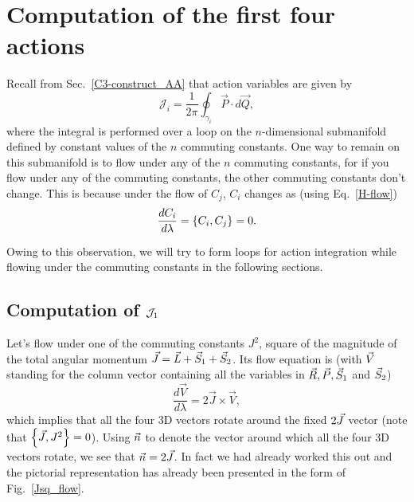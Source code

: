 \chapter{Computation of the first four actions}    \label{chapter-5}





Recall from Sec.~\ref{C3-construct_AA} that action variables are given by
\begin{equation}
\mathcal{J}_{i}=\frac{1}{2 \pi} \oint_{\gamma_{i}} \vec{P} \cdot d \vec{Q} , 
\end{equation}
where the integral is performed over  a loop on the $n$-dimensional 
submanifold defined by constant values of the $n$ commuting constants.
One way to remain on this submanifold is to flow under any of the 
$n$ commuting constants, for if you flow under any of the commuting 
constants, the other commuting constants don't change. This is because
under the flow of $C_j$, $C_i$ changes as (using Eq.~\eqref{H-flow})
\begin{align}
\frac{d C_i}{d \lambda} =  \left\lbrace C_i, C_j \right\rbrace   = 0 .
\end{align}



Owing to this observation, we will try to
form loops for action integration while flowing 
under the commuting constants in the following sections.



\section{Computation of $\mathcal{J}_1$}    \label{result_first_action}



Let's flow under one of the commuting constants $J^2$, square of the 
magnitude of the total angular momentum $\vec{J} = \vec{L} + \vec{S}_1 + \vec{S}_2$.
Its flow equation is (with $\vec{V}$ standing for 
the column vector containing all the variables in $\vec{R}, \vec{P}, \vec{S}_1$
and $\vec{S}_2$)
\begin{equation}
\frac{d \vec{V}}{d \lambda} = 2 \vec{J} \times \vec{V},      \label{flow_action_1}
\end{equation}
which implies that all the four 3D vectors rotate around 
the fixed $2 \vec{J}$ vector (note that $\left\lbrace \vec{J}, J^2 \right\rbrace = 0$).
Using $\vec{n}$ to denote the vector around which all the four
3D vectors rotate, we see that $\vec{n} = 2 \vec{J} $.
In fact we had already worked this out and the pictorial 
representation has already been presented in the form 
of Fig.~\ref{Jsq_flow}.


